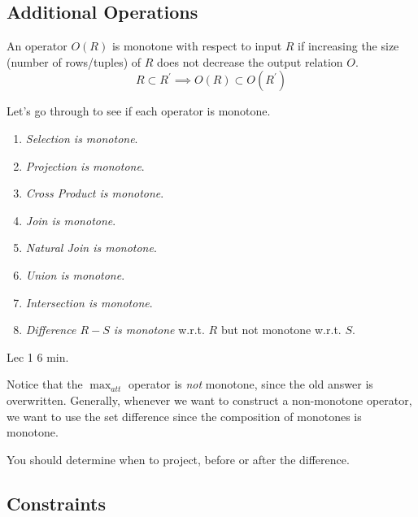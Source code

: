 \documentclass{article}
\begin{document}
  \subsection{Additional Operations}
    
    \begin{definition}
      An operator $O(R)$ is monotone with respect to input $R$ if increasing the size (number of rows/tuples) of $R$ does not decrease the output relation $O$.  
      \begin{equation}
        R \subset R^\prime \implies O(R) \subset O(R^\prime)
      \end{equation}
    \end{definition}

    \begin{example}
      Let's go through to see if each operator is monotone. 
      \begin{enumerate}
        \item \textit{Selection is monotone}. 
        \item \textit{Projection is monotone}. 
        \item \textit{Cross Product is monotone}. 
        \item \textit{Join is monotone}. 
        \item \textit{Natural Join is monotone}. 
        \item \textit{Union is monotone}. 
        \item \textit{Intersection is monotone}. 
        \item \textit{Difference $R - S$ is monotone} w.r.t. $R$ but not monotone w.r.t. $S$.
      \end{enumerate}
    \end{example}

    \begin{example}
      Lec 1 6 min. 
    \end{example}

    Notice that the $\max_{att}$ operator is \textit{not} monotone, since the old answer is overwritten. Generally, whenever we want to construct a non-monotone operator, we want to use the set difference since the composition of monotones is monotone. 

    You should determine when to project, before or after the difference. 

  \subsection{Constraints}
\end{document}
